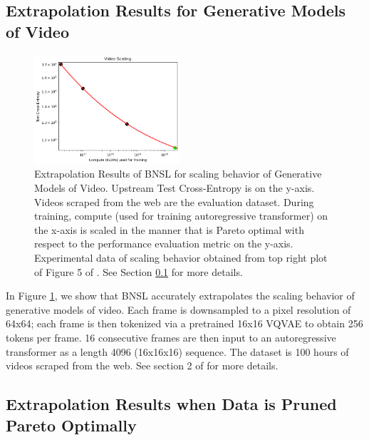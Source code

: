 \documentclass{article} %
\begin{document}
\FloatBarrier

\subsection{Extrapolation Results for Generative Models of Video}
\label{section:video}

\begin{figure}[htbp]
    \centering
\includegraphics[width=0.48\textwidth]{figures/video/video__compute.png}

    \caption{
Extrapolation Results of BNSL for scaling behavior of Generative Models of Video. Upstream Test Cross-Entropy is on the y-axis. Videos scraped from the web are the evaluation dataset. During training, compute (used for training autoregressive transformer) on the x-axis is scaled in the manner that is Pareto optimal with respect to the performance evaluation metric on the y-axis. Experimental data of scaling behavior obtained from top right plot of Figure 5 of \cite{2020arXiv201014701H}. See Section \ref{section:video} for more details.
    }
    \label{fig:video_compute_scaling}
\end{figure}

In Figure \ref{fig:video_compute_scaling}, we show that BNSL accurately extrapolates the scaling behavior of generative models of video. Each frame is downsampled to a pixel resolution of 64x64; each frame is then tokenized via a pretrained 16x16 VQVAE \citep{van2017neural} to obtain 256 tokens per frame. 16 consecutive frames are then input to an autoregressive transformer as a length 4096 (16x16x16) sequence. The dataset is 100 hours of videos scraped from the web. See section 2 of \cite{2020arXiv201014701H} for more details.

\FloatBarrier

\clearpage

\subsection{Extrapolation Results when Data is Pruned Pareto Optimally}
\label{section:data_prune}
\end{document}
